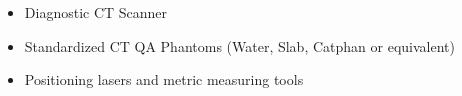 \begin{itemize}
    \item Diagnostic CT Scanner
    \item Standardized CT QA Phantoms (Water, Slab, Catphan or equivalent)
    \item Positioning lasers and metric measuring tools
\end{itemize}